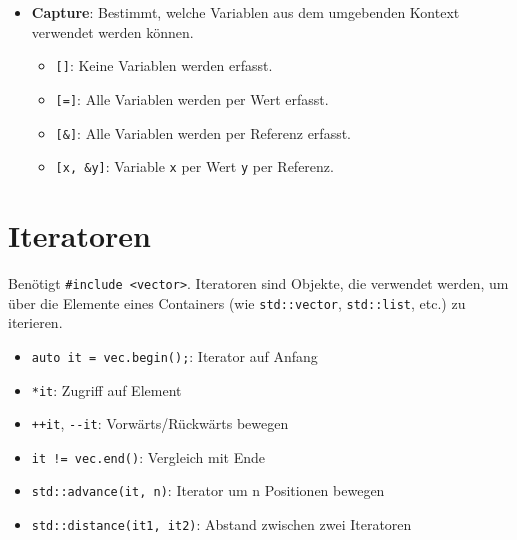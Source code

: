 \documentclass[10pt, a3paper, landscape]{article}
\begin{document}
\begin{multicols*}{4}
\begin{itemize}
    \item \textbf{Capture}: Bestimmt, welche Variablen aus dem umgebenden Kontext verwendet werden können.
    \begin{itemize}
        \item \lstinline|[]|: Keine Variablen werden erfasst.
        \item \lstinline|[=]|: Alle Variablen werden per Wert erfasst.
        \item \lstinline|[&]|: Alle Variablen werden per Referenz erfasst.
        \item \lstinline|[x, &y]|: Variable \lstinline|x| per Wert \lstinline|y| per Referenz.
    \end{itemize}
\end{itemize}

\section{Iteratoren}
Benötigt \lstinline|#include <vector>|. 
Iteratoren sind Objekte, die verwendet werden, um über die Elemente eines Containers (wie \lstinline|std::vector|, \lstinline|std::list|, etc.) zu iterieren. 
\begin{itemize}
    \item \lstinline|auto it = vec.begin();|: Iterator auf Anfang
    \item \lstinline|*it|: Zugriff auf Element
    \item \lstinline|++it|, \lstinline|--it|: Vorwärts/Rückwärts bewegen
    \item \lstinline|it != vec.end()|: Vergleich mit Ende
    \item \lstinline|std::advance(it, n)|: Iterator um n Positionen bewegen
    \item \lstinline|std::distance(it1, it2)|: Abstand zwischen zwei Iteratoren
\end{itemize}



\end{multicols*}
\end{document}
